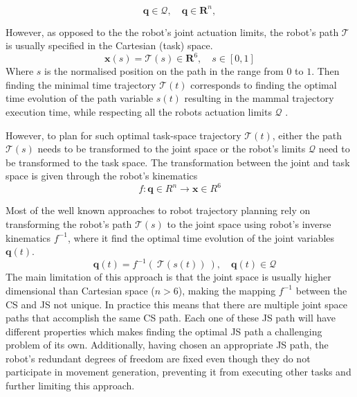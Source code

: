 \begin{equation}
\bm{q} \in \mathcal{Q}, \quad \bm{q}\in \bm{R}^n,
\end{equation}

However, as opposed to the the robot's joint actuation limits, the robot's path $\mathcal{T}$ is usually specified in the Cartesian (task) space.
\begin{equation}
\bm{x}(s) = \mathcal{T}(s) \in \bm{R}^6,\quad s\in\left[0,1\right]
\end{equation}
Where $s$ is the normalised position on the path in the range from $0$ to $1$. Then finding the minimal time trajectory $\mathcal{T}(t)$ corresponds to finding the optimal time evolution of the path variable $s(t)$ resulting in the mammal trajectory execution time, while respecting all the robots actuation limits $\mathcal{Q}$ \cite{modernrobotics}. 

However, to plan for such optimal task-space trajectory $\mathcal{T}(t)$, either the path $\mathcal{T}(s)$ needs to be transformed to the joint space or the robot's limits $\mathcal{Q}$ need to be transformed to the task space.
The transformation between the joint and task space is given through the robot's kinematics
\begin{equation}
f : \bm{q} \in R^n \to \bm{x}\in  R^6
\end{equation}

Most of the well known approaches to robot trajectory planning rely on transforming the robot's path $\mathcal{T}(s)$ to the joint space using robot's inverse kinematics $f^{-1}$, where it find the optimal time evolution of the joint variables $\bm{q}(t)$.
\begin{equation}
 \quad \bm{q}(t) = f^{-1}\left(~\mathcal{T}\left(s\left(t\right)\right)~\right), \quad\bm{q}(t) \in \mathcal{Q} 
\end{equation}
The main limitation of this approach is that the joint space is usually higher dimensional than Cartesian space ($n>6$), making the mapping $f^{-1}$ between the CS and JS not unique. In practice this means that there are multiple joint space paths that accomplish the same CS path. Each one of these JS path will have different properties which makes finding the optimal JS path a challenging problem of its own. Additionally, having chosen an appropriate JS path, the robot's redundant degrees of freedom are fixed even though they do not participate in movement generation, preventing it from executing other tasks and further limiting this approach.


